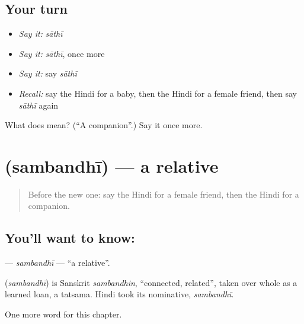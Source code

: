 \subsection*{Your turn}
\begin{itemize}
\raggedright
  \item \emph{Say it:} \emph{sāthī}
  \item \emph{Say it:} \emph{sāthī}, once more
  \item \emph{Say it:} say \emph{sāthī}
  \item \emph{Recall:} say the Hindi for a baby, then the Hindi for a female friend, then say \emph{sāthī} again
\end{itemize}

\begin{tcolorbox}[breakable,colback=teal!4,colframe=teal!35!black,title={Before you move on}]
What does  mean? (\textquotedblleft{}A companion\textquotedblright{}.) Say it once more.
\end{tcolorbox}
\section[\texorpdfstring{\hi{संबंधी} (sambandhī)}{संबंधी (sambandhī)}]{ (sambandhī) — a relative}

\label{lesson:HI-C254-sambandhi}



\begin{quote}
Before the new one: say the Hindi for a female friend, then the Hindi for a companion.
\end{quote}

\subsection*{You'll want to know: }
\textbf{} — \emph{sambandhī} — \textquotedblleft{}a relative\textquotedblright{}.

\begin{cousinweb}
\textbf{} (\emph{sambandhī}) is Sanskrit \emph{sambandhin}, \textquotedblleft{}connected, related\textquotedblright{}, taken over whole as a learned loan, a tatsama. Hindi took its nominative, \emph{sambandhī}.
\end{cousinweb}

\begin{grammarlens}[title={What you've built}]
One more word for this chapter.
\end{grammarlens}


